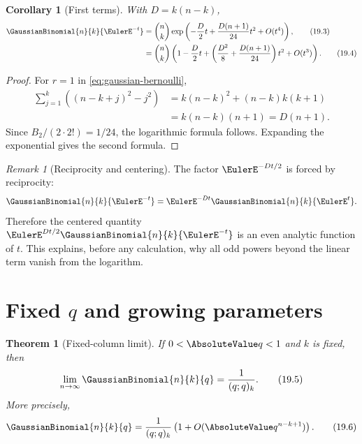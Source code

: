 \documentclass[11pt,a4paper,oneside,openany]{book}
\newtheorem{theorem}{Theorem}[chapter]
\newtheorem{corollary}[corollary]{Corollary}
\theoremstyle{definition}
\theoremstyle{remark}
\newtheorem{remark}[remark]{Remark}
\begin{document}

\begin{corollary}[First terms]\label{cor:gaussian-first-asymptotic}
With $D=k(n-k)$,
\begin{align}
 \GaussianBinomial{n}{k}{\EulerE^{-t}}
 &=\binom nk
 \exp\left(
 -\frac D2t+\frac{D(n+1)}{24}t^2+O(t^4)
 \right),
 \tag{19.3}\label{eq:gaussian-first-asymptotic}\\
 &=\binom nk\left(
 1-\frac D2t+
 \left(\frac{D^2}{8}+\frac{D(n+1)}{24}\right)t^2
 +O(t^3)
 \right).
 \tag{19.4}\label{eq:gaussian-first-expanded}
\end{align}
\end{corollary}

\begin{proof}
For $r=1$ in \eqref{eq:gaussian-bernoulli},
\begin{align*}
 \sum_{j=1}^{k}\left((n-k+j)^2-j^2\right)
 &=k(n-k)^2+(n-k)k(k+1)\\
 &=k(n-k)(n+1)=D(n+1).
\end{align*}
Since $B_2/(2\cdot2!)=1/24$, the logarithmic formula follows.  Expanding the exponential gives the second formula.
\end{proof}

\begin{remark}[Reciprocity and centering]
The factor $\EulerE^{-Dt/2}$ is forced by reciprocity:
\[
 \GaussianBinomial{n}{k}{\EulerE^{-t}}
 =\EulerE^{-Dt}\GaussianBinomial{n}{k}{\EulerE^t}.
\]
Therefore the centered quantity $\EulerE^{Dt/2}\GaussianBinomial{n}{k}{\EulerE^{-t}}$ is an even analytic function of $t$.  This explains, before any calculation, why all odd powers beyond the linear term vanish from the logarithm.
\end{remark}

\section{Fixed \texorpdfstring{$q$}{q} and growing parameters}

\begin{theorem}[Fixed-column limit]\label{thm:fixed-column-limit}
If $0<\AbsoluteValue q<1$ and $k$ is fixed, then
\[
 \lim_{n\to\infty}\GaussianBinomial{n}{k}{q}=\frac1{(q;q)_k}.
 \tag{19.5}\label{eq:fixed-column-limit}
\]
More precisely,
\[
 \GaussianBinomial{n}{k}{q}
 =\frac1{(q;q)_k}\left(1+O(\AbsoluteValue q^{n-k+1})\right).
 \tag{19.6}\label{eq:fixed-column-error}
\]
\end{theorem}
\end{document}
